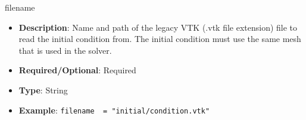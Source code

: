 filename
\vspace{\the\parameterListSpacing}
\begin{itemize}
    \item {\bf Description}: Name and path of the legacy VTK (.vtk file extension) file to read the initial condition from. The initial condition must use the same mesh that is used in the solver. 
    \item {\bf Required/Optional}: Required
    \item {\bf Type}: String
    \item {\bf Example}: \lstinline!filename  = "initial/condition.vtk"!
\end{itemize}

